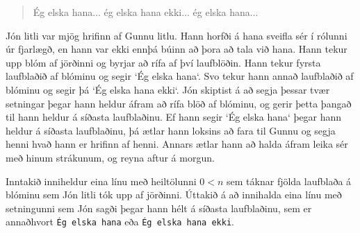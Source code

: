 

\begin{quote}
Ég elska hana... ég elska hana ekki... ég elska hana...
\end{quote}

Jón litli var mjög hrifinn af Gunnu litlu. Hann horfði á hana sveifla sér í
rólunni úr fjarlægð, en hann var ekki ennþá búinn að þora að tala við hana.
Hann tekur upp blóm af jörðinni og byrjar að rífa af því laufblöðin. Hann tekur
fyrsta laufblaðið af blóminu og segir `Ég elska hana`. Svo tekur hann annað
laufblaðið af blóminu og segir þá `Ég elska hana ekki`. Jón skiptist á að
segja þessar tvær setningar þegar hann heldur áfram að rífa blöð af blóminu, og
gerir þetta þangað til hann heldur á síðasta laufblaðinu. Ef hann segir `Ég
elska hana` þegar hann heldur á síðasta laufblaðinu, þá ætlar hann loksins að
fara til Gunnu og segja henni hvað hann er hrifinn af henni. Annars ætlar hann
að halda áfram leika sér með hinum strákunum, og reyna aftur á morgun.

Inntakið inniheldur eina línu með heiltölunni $0 < n$ sem táknar fjölda
laufblaða á blóminu sem Jón litli tók upp af jörðinni. Úttakið á að innihalda
eina línu með setningunni sem Jón sagði þegar hann hélt á síðasta laufblaðinu,
sem er annaðhvort \texttt{Ég elska hana} eða \texttt{Ég elska hana ekki}.

